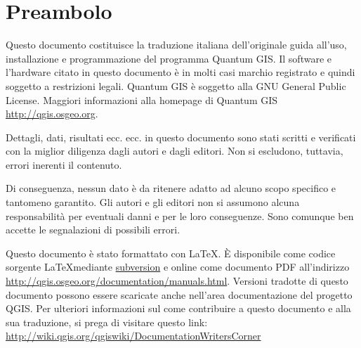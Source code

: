 
\newcommand\qgistip[1]{\raggedright\small{#1}}
\renewcommand{\topfraction}{0.85}
\renewcommand{\textfraction}{0.1}
\renewcommand{\floatpagefraction}{0.75}
\thispagestyle{empty}


\section*{Preambolo}


\vspace{1cm}



Questo documento costituisce la traduzione italiana dell'originale
guida all'uso, installazione e programmazione del programma Quantum
GIS. Il software e l'hardware citato in questo documento è in
molti casi marchio registrato e quindi soggetto a restrizioni
legali. Quantum GIS è soggetto alla GNU General Public License. Maggiori
informazioni alla homepage di Quantum GIS
\url{http://qgis.osgeo.org}.

Dettagli, dati, risultati ecc. ecc. in questo documento sono stati
scritti e verificati con la miglior diligenza dagli autori
e dagli editori. Non si escludono, tuttavia, errori inerenti il contenuto.

Di conseguenza, nessun dato è da ritenere adatto ad alcuno scopo specifico
e tantomeno garantito. Gli autori e gli editori non si assumono alcuna responsabilità per eventuali
danni e per le loro conseguenze. Sono comunque ben accette le segnalazioni
di possibili errori.

Questo documento è stato formattato con \LaTeX. È disponibile come codice
sorgente \LaTeX mediante \href{http://wiki.qgis.org/qgiswiki/DocumentationWritersCorner}{subversion} e online come documento PDF all'indirizzo \url{http://qgis.osgeo.org/documentation/manuals.html}.
Versioni tradotte di questo documento possono essere scaricate anche nell'area documentazione del progetto QGIS. Per ulteriori informazioni sul come contribuire a questo documento e alla sua traduzione, si prega di visitare questo link:
\url{http://wiki.qgis.org/qgiswiki/DocumentationWritersCorner}

